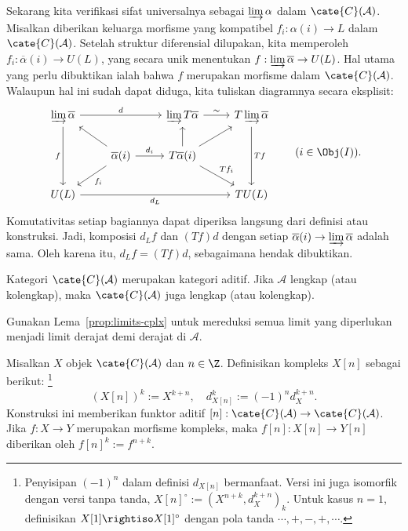 \begin{bukti}
	Sekarang kita verifikasi sifat universalnya sebagai $\varinjlim\alpha$
	dalam $\cate{C}(\mathcal{A})$. Misalkan diberikan keluarga morfisme yang
	kompatibel $f_i:\alpha(i)\to L$ dalam $\cate{C}(\mathcal{A})$. Setelah
	struktur diferensial dilupakan, kita memperoleh
	$f_i:\overline{\alpha}(i)\to U(L)$, yang secara unik menentukan
	$f:\varinjlim\overline{\alpha}\to U(L)$. Hal utama yang perlu dibuktikan
	ialah bahwa $f$ merupakan morfisme dalam $\cate{C}(\mathcal{A})$. Walaupun
	hal ini sudah dapat diduga, kita tuliskan diagramnya secara eksplisit:
	\[\begin{tikzcd}
		\varinjlim \overline{\alpha} \arrow[dd, "f"'] \arrow[rr, "d"] & & \varinjlim T\overline{\alpha} \arrow[r, "\sim"] & T\varinjlim \overline{\alpha} \arrow[dd, "{Tf}"] \\
		& \overline{\alpha}(i) \arrow[lu] \arrow[ld, "{f_i}"] \arrow[r, "d_i"] & T\overline{\alpha}(i) \arrow[ru] \arrow[rd, "{Tf_i}"] \arrow[u] & \\
		U(L) \arrow[rrr, "d_L"'] & & & TU(L)
	\end{tikzcd} \qquad (i \in \Obj(I)). \]
	Komutativitas setiap bagiannya dapat diperiksa langsung dari definisi atau
	konstruksi. Jadi, komposisi $d_Lf$ dan $(Tf)d$ dengan setiap
	$\overline{\alpha}(i)\to\varinjlim\overline{\alpha}$ adalah sama. Oleh karena itu,
	$d_Lf=(Tf)d$, sebagaimana hendak dibuktikan.
\end{bukti}

\begin{proposisi}\label{prop:additive-cat-cplx}
	Kategori $\cate{C}(\mathcal{A})$ merupakan kategori aditif. Jika
	$\mathcal{A}$ lengkap (atau kolengkap), maka $\cate{C}(\mathcal{A})$ juga
	lengkap (atau kolengkap).
\end{proposisi}
\begin{bukti}
	Gunakan Lema~\ref{prop:limits-cplx} untuk mereduksi semua limit yang
	diperlukan menjadi limit derajat demi derajat di $\mathcal{A}$.
\end{bukti}

\begin{definisi}\label{def:translation-functor}
	Misalkan $X$ objek $\cate{C}(\mathcal{A})$ dan $n\in\Z$. Definisikan
	kompleks $X[n]$ sebagai berikut:%
	\footnote{Penyisipan $(-1)^n$ dalam definisi $d_{X[n]}$ bermanfaat.
	Versi ini juga isomorfik dengan versi tanpa tanda,
	$X[n]^\circ:=\left(X^{n+k},d_X^{k+n}\right)_k$. Untuk kasus $n=1$,
	definisikan $X[1]\rightiso X[1]^\circ$ dengan pola tanda
	$\cdots,+,-,+,\cdots$.}
	\[ \left(X[n]\right)^k:=X^{k+n},\quad
	d_{X[n]}^k:=(-1)^nd_X^{k+n}. \]
	Konstruksi ini memberikan funktor aditif
	$[n]:\cate{C}(\mathcal{A})\to\cate{C}(\mathcal{A})$. Jika
	$f:X\to Y$ merupakan morfisme kompleks, maka $f[n]:X[n]\to Y[n]$
	diberikan oleh $f[n]^k:=f^{n+k}$.
\end{definisi}

